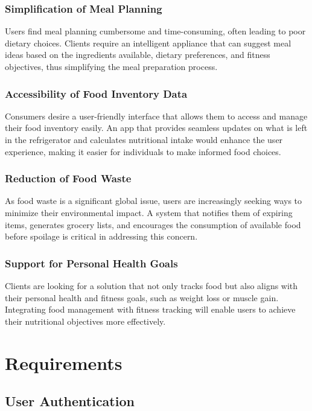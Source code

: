 \documentclass[conference]{IEEEtran}
\begin{document}
\subsubsection{Simplification of Meal Planning}
Users find meal planning cumbersome and time-consuming, often leading to poor dietary choices. Clients require an intelligent appliance that can suggest meal ideas based on the ingredients available, dietary preferences, and fitness objectives, thus simplifying the meal preparation process.\\

\subsubsection{Accessibility of Food Inventory Data}
Consumers desire a user-friendly interface that allows them to access and manage their food inventory easily. An app that provides seamless updates on what is left in the refrigerator and calculates nutritional intake would enhance the user experience, making it easier for individuals to make informed food choices.\\

\subsubsection{Reduction of Food Waste}
As food waste is a significant global issue, users are increasingly seeking ways to minimize their environmental impact. A system that notifies them of expiring items, generates grocery lists, and encourages the consumption of available food before spoilage is critical in addressing this concern.\\

\subsubsection{Support for Personal Health Goals}
Clients are looking for a solution that not only tracks food but also aligns with their personal health and fitness goals, such as weight loss or muscle gain. Integrating food management with fitness tracking will enable users to achieve their nutritional objectives more effectively.\\


\section{Requirements}
\subsection{User Authentication}
\end{document}
